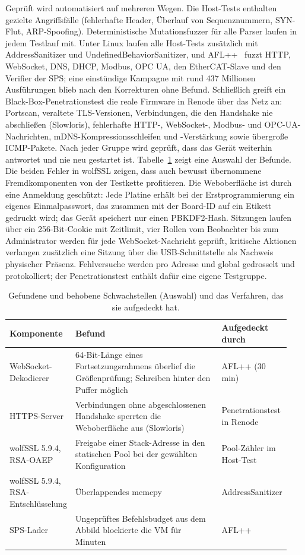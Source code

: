 \documentclass[]{article}
\begin{document}
Geprüft wird automatisiert auf mehreren Wegen. Die Host-Tests enthalten gezielte Angriffsfälle (fehlerhafte Header, Überlauf von Sequenznummern, SYN-Flut, ARP-Spoofing). Deterministische Mutationsfuzzer für alle Parser laufen in jedem Testlauf mit. Unter Linux laufen alle Host-Tests zusätzlich mit AddressSanitizer und UndefinedBehaviorSanitizer, und AFL++~\cite{aflpp} fuzzt HTTP, WebSocket, DNS, DHCP, Modbus, OPC UA, den EtherCAT-Slave und den Verifier der SPS; eine einstündige Kampagne mit rund 437 Millionen Ausführungen blieb nach den Korrekturen ohne Befund. Schließlich greift ein Black-Box-Penetrationstest die reale Firmware in Renode über das Netz an: Portscan, veraltete TLS-Versionen, Verbindungen, die den Handshake nie abschließen (Slowloris), fehlerhafte HTTP-, WebSocket-, Modbus- und OPC-UA-Nachrichten, mDNS-Kompressionsschleifen und -Verstärkung sowie übergroße ICMP-Pakete. Nach jeder Gruppe wird geprüft, dass das Gerät weiterhin antwortet und nie neu gestartet ist. Tabelle~\ref{tab:befunde} zeigt eine Auswahl der Befunde. Die beiden Fehler in wolfSSL zeigen, dass auch bewusst übernommene Fremdkomponenten von der Testkette profitieren. Die Weboberfläche ist durch eine Anmeldung geschützt: Jede Platine erhält bei der Erstprogrammierung ein eigenes Einmalpasswort, das zusammen mit der Board-ID auf ein Etikett gedruckt wird; das Gerät speichert nur einen PBKDF2-Hash. Sitzungen laufen über ein 256-Bit-Cookie mit Zeitlimit, vier Rollen vom Beobachter bis zum Administrator werden für jede WebSocket-Nachricht geprüft, kritische Aktionen verlangen zusätzlich eine Sitzung über die USB-Schnittstelle als Nachweis physischer Präsenz. Fehlversuche werden pro Adresse und global gedrosselt und protokolliert; der Penetrationstest enthält dafür eine eigene Testgruppe.

\begin{table}[htbp]
\centering
\small
\caption{Gefundene und behobene Schwachstellen (Auswahl) und das Verfahren, das sie aufgedeckt hat.}
\label{tab:befunde}
\begin{tabular}{p{0.22\linewidth}p{0.52\linewidth}p{0.20\linewidth}}
\toprule
\textbf{Komponente} & \textbf{Befund} & \textbf{Aufgedeckt durch} \\
\midrule
WebSocket-Dekodierer & 64-Bit-Länge eines Fortsetzungsrahmens überlief die Größenprüfung; Schreiben hinter den Puffer möglich & AFL++ (30 min) \\[2pt]
HTTPS-Server & Verbindungen ohne abgeschlossenen Handshake sperrten die Weboberfläche aus (Slowloris) & Penetrationstest in Renode \\[2pt]
wolfSSL 5.9.4, RSA-OAEP & Freigabe einer Stack-Adresse in den statischen Pool bei der gewählten Konfiguration & Pool-Zähler im Host-Test \\[2pt]
wolfSSL 5.9.4, RSA-Entschlüsselung & Überlappendes memcpy & AddressSanitizer \\[2pt]
SPS-Lader & Ungeprüftes Befehlsbudget aus dem Abbild blockierte die VM für Minuten & AFL++ \\[2pt]
\bottomrule
\end{tabular}
\end{table}
\end{document}
